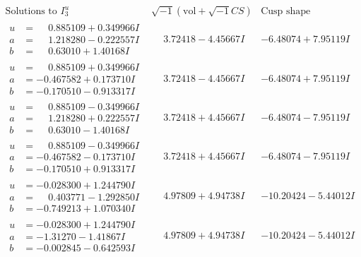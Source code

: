 \documentclass[1p]{elsarticle_modified}
\theoremstyle{definition}
\newcommand{\I}{\sqrt{-1}}
\begin{document}
$$\begin{array}{c|c|c}  
\text{Solutions to }I^u_{3}& \I (\text{vol} + \sqrt{-1}CS) & \text{Cusp shape}\\
 \hline 
\begin{aligned}
u &= \phantom{-}0.885109 + 0.349966 I \\
a &= \phantom{-}1.218280 - 0.222557 I \\
b &= \phantom{-}0.63010 + 1.40168 I\end{aligned}
 & \phantom{-}3.72418 - 4.45667 I & -6.48074 + 7.95119 I \\ \hline\begin{aligned}
u &= \phantom{-}0.885109 + 0.349966 I \\
a &= -0.467582 + 0.173710 I \\
b &= -0.170510 - 0.913317 I\end{aligned}
 & \phantom{-}3.72418 - 4.45667 I & -6.48074 + 7.95119 I \\ \hline\begin{aligned}
u &= \phantom{-}0.885109 - 0.349966 I \\
a &= \phantom{-}1.218280 + 0.222557 I \\
b &= \phantom{-}0.63010 - 1.40168 I\end{aligned}
 & \phantom{-}3.72418 + 4.45667 I & -6.48074 - 7.95119 I \\ \hline\begin{aligned}
u &= \phantom{-}0.885109 - 0.349966 I \\
a &= -0.467582 - 0.173710 I \\
b &= -0.170510 + 0.913317 I\end{aligned}
 & \phantom{-}3.72418 + 4.45667 I & -6.48074 - 7.95119 I \\ \hline\begin{aligned}
u &= -0.028300 + 1.244790 I \\
a &= \phantom{-}0.403771 - 1.292850 I \\
b &= -0.749213 + 1.070340 I\end{aligned}
 & \phantom{-}4.97809 + 4.94738 I & -10.20424 - 5.44012 I \\ \hline\begin{aligned}
u &= -0.028300 + 1.244790 I \\
a &= -1.31270 - 1.41867 I \\
b &= -0.002845 - 0.642593 I\end{aligned}
 & \phantom{-}4.97809 + 4.94738 I & -10.20424 - 5.44012 I \\ \hline\begin{aligned}

\end{aligned}
\end{array}$$
\end{document}
